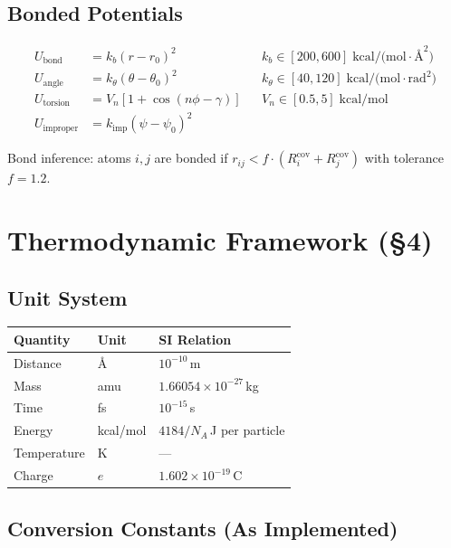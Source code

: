 \documentclass[11pt, a4paper]{article}
\begin{document}
\subsection{Bonded Potentials}

\begin{align}
U_\text{bond} &= k_b(r - r_0)^2 && k_b \in [200, 600]\;\text{kcal/(mol}\cdot\text{\AA}^2) \\
U_\text{angle} &= k_\theta(\theta - \theta_0)^2 && k_\theta \in [40, 120]\;\text{kcal/(mol}\cdot\text{rad}^2) \\
U_\text{torsion} &= V_n[1 + \cos(n\phi - \gamma)] && V_n \in [0.5, 5]\;\text{kcal/mol} \\
U_\text{improper} &= k_\text{imp}(\psi - \psi_0)^2
\end{align}

Bond inference: atoms $i,j$ are bonded if $r_{ij} < f \cdot (R_i^\text{cov} + R_j^\text{cov})$ with tolerance $f = 1.2$.


\section{Thermodynamic Framework (\S4)}

\subsection{Unit System}

\begin{center}
\begin{tabular}{lll}
\toprule
Quantity & Unit & SI Relation \\
\midrule
Distance & \AA & $10^{-10}$\,m \\
Mass & amu & $1.66054 \times 10^{-27}$\,kg \\
Time & fs & $10^{-15}$\,s \\
Energy & kcal/mol & $4184/N_A$\,J per particle \\
Temperature & K & --- \\
Charge & $e$ & $1.602 \times 10^{-19}$\,C \\
\bottomrule
\end{tabular}
\end{center}

\subsection{Conversion Constants (As Implemented)}
\end{document}
